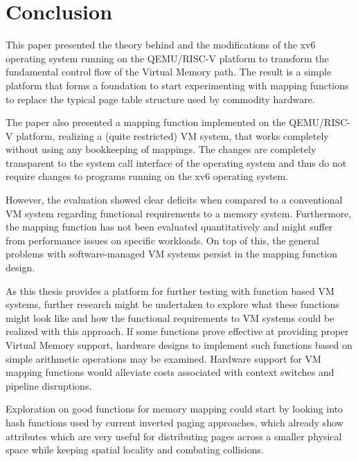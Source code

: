\chapter{Conclusion}

\label{chap:conclusion}



This paper presented the theory behind and the modifications of the xv6 operating system running on the QEMU/RISC-V platform to transform the fundamental control flow of the Virtual Memory path. The result is a simple platform that forms a foundation to start experimenting with mapping functions to replace the typical page table structure used by commodity hardware.

The paper also presented a mapping function implemented on the QEMU/RISC-V platform, realizing a (quite restricted) VM system, that works completely without using any bookkeeping of mappings. The changes are completely transparent to the system call interface of the operating system and thus do not require changes to programs running on the xv6 operating system.

However, the evaluation showed clear deficits when compared to a conventional VM system regarding functional requirements to a memory system. Furthermore, the mapping function has not been evaluated quantitatively and might suffer from performance issues on specific workloads. On top of this, the general problems with software-managed VM systems persist in the mapping function design.

As this thesis provides a platform for further testing with function based VM systems, further research might be undertaken to explore what these functions might look like and how the functional requirements to VM systems could be realized with this approach. If some functions prove effective at providing proper Virtual Memory support, hardware designs to implement such functions based on simple arithmetic operations may be examined. Hardware support for VM mapping functions would alleviate costs associated with context switches and pipeline disruptions.

Exploration on good functions for memory mapping could start by looking into hash functions used by current inverted paging approaches, which already show attributes which are very useful for distributing pages across a smaller physical space while keeping spatial locality and combating collisions.